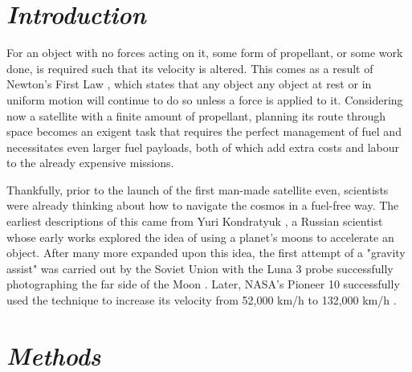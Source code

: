 \documentclass[11pt, english]{report}
\begin{document}
\tableofcontents

\clearpage

\setlength{\cftbeforeloftitleskip}{-22pt}
\renewcommand{\cftloftitlefont}{\hfill\huge\bfseries}
\renewcommand{\cftafterloftitle}{\hfill}
\listoffigures

\clearpage



\cleardoublepage

\chapter{\textsl{Introduction}}
\normalsize{\noindent For an object with no forces acting on it, some form of propellant, or some work done, is required such that its velocity is altered. This comes as a result of Newton's First Law \cite{newton_principia_1999}, which states that any object any object at rest or in uniform motion will continue to do so unless a force is applied to it. Considering now a satellite with a finite amount of propellant, planning its route through space becomes an exigent task that requires the perfect management of fuel and necessitates even larger fuel payloads, both of which add extra costs and labour to the already expensive missions.

Thankfully, prior to the launch of the first man-made satellite even, scientists were already thinking about how to navigate the cosmos in a fuel-free way. The earliest descriptions of this came from Yuri Kondratyuk \cite{noauthor_kondratuk_nodate}, a Russian scientist whose early works explored the idea of using a planet's moons to accelerate an object. After many more expanded upon this idea, the first attempt of a "gravity assist" was carried out by the Soviet Union with the Luna 3 probe successfully photographing the far side of the Moon \cite{noauthor_luna_nodate}. Later, NASA's Pioneer 10 successfully used the technique to increase its velocity from 52,000 km/h to 132,000 km/h \cite{administrator_pioneer_2015}.}



%

\chapter{\textsl{Methods}}
\end{document}
